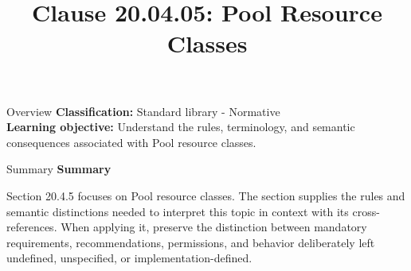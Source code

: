 \documentclass[10pt,letterpaper]{article}
\title{Clause 20.04.05: Pool Resource Classes}
\author{}
\date{}
\begin{document}
\maketitle
\begin{CornellOverviewBox}{Overview}
\textbf{Classification:} Standard library - Normative\\[2pt]
\textbf{Learning objective:} Understand the rules, terminology, and semantic consequences associated with Pool resource classes.
\end{CornellOverviewBox}\begin{CornellSummaryBox}{Summary}
{\sffamily\bfseries\color{Accent} Summary}\par\vspace{3pt}Section 20.4.5 focuses on Pool resource classes. The section supplies the rules and semantic distinctions needed to interpret this topic in context with its cross-references. When applying it, preserve the distinction between mandatory requirements, recommendations, permissions, and behavior deliberately left undefined, unspecified, or implementation-defined.
\end{CornellSummaryBox}
\end{document}

